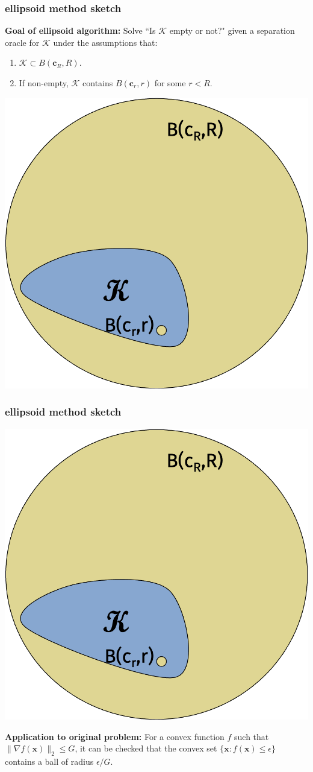 \documentclass[compress]{beamer}
\newcommand{\bv}[1]{\mathbf{#1}}
\begin{document}
\begin{frame}[t]
\frametitle{ellipsoid method sketch}
\textbf{Goal of ellipsoid algorithm:} Solve ``Is $\mathcal{K}$ empty or not?" given a separation oracle for $\mathcal{K}$ under the assumptions that:
\begin{enumerate}
	\item $\mathcal{K} \subset B(\bv{c}_R, R)$.
	\item If non-empty, $\mathcal{K}$ contains $B(\bv{c}_r, r)$ for some $r < R$. 
\end{enumerate}
\begin{center}
	\includegraphics[width=.5\textwidth]{ellipsoid0.png}
\end{center}
\end{frame}

\begin{frame}[t]
	\frametitle{ellipsoid method sketch}
	\begin{center}
		\includegraphics[width=.5\textwidth]{ellipsoid0.png}
	\end{center}
	\textbf{Application to original problem:} For a convex function $f$ such that $\|\nabla f(\bv{x})\|_2 \leq G$, it can be checked that the convex set $\{\bv{x} : f(\bv{x}) \leq \epsilon\}$ contains a ball of radius $\epsilon/G$. 
	\end{frame}
	
\end{document}
